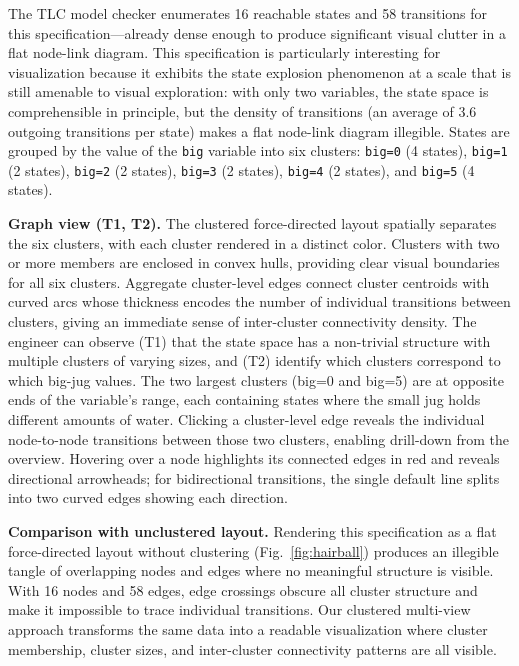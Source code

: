\documentclass[conference]{IEEEtran}
\begin{document}
The TLC model checker enumerates 16 reachable states and 58 transitions for this specification---already dense enough to produce significant visual clutter in a flat node-link diagram. This specification is particularly interesting for visualization because it exhibits the state explosion phenomenon at a scale that is still amenable to visual exploration: with only two variables, the state space is comprehensible in principle, but the density of transitions (an average of 3.6 outgoing transitions per state) makes a flat node-link diagram illegible. States are grouped by the value of the \texttt{big} variable into six clusters: \texttt{big=0} (4 states), \texttt{big=1} (2 states), \texttt{big=2} (2 states), \texttt{big=3} (2 states), \texttt{big=4} (2 states), and \texttt{big=5} (4 states).

\textbf{Graph view (T1, T2).} The clustered force-directed layout spatially separates the six clusters, with each cluster rendered in a distinct color. Clusters with two or more members are enclosed in convex hulls, providing clear visual boundaries for all six clusters. Aggregate cluster-level edges connect cluster centroids with curved arcs whose thickness encodes the number of individual transitions between clusters, giving an immediate sense of inter-cluster connectivity density. The engineer can observe (T1) that the state space has a non-trivial structure with multiple clusters of varying sizes, and (T2) identify which clusters correspond to which big-jug values. The two largest clusters (big=0 and big=5) are at opposite ends of the variable's range, each containing states where the small jug holds different amounts of water. Clicking a cluster-level edge reveals the individual node-to-node transitions between those two clusters, enabling drill-down from the overview. Hovering over a node highlights its connected edges in red and reveals directional arrowheads; for bidirectional transitions, the single default line splits into two curved edges showing each direction.

\textbf{Comparison with unclustered layout.} Rendering this specification as a flat force-directed layout without clustering (Fig.~\ref{fig:hairball}) produces an illegible tangle of overlapping nodes and edges where no meaningful structure is visible. With 16 nodes and 58 edges, edge crossings obscure all cluster structure and make it impossible to trace individual transitions. Our clustered multi-view approach transforms the same data into a readable visualization where cluster membership, cluster sizes, and inter-cluster connectivity patterns are all visible.
\end{document}

